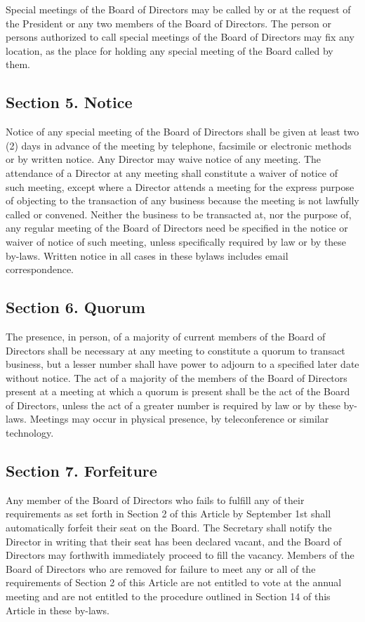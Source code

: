 \documentclass[a4paper]{article}
\begin{document}
Special meetings of the Board of Directors may be called by or at the request of the President or any two members of the Board of Directors.  The person or persons authorized to call special meetings of the Board of Directors may fix any location, as the place for holding any special meeting of the Board called by them.

\subsection*{Section 5. Notice}

Notice of any special meeting of the Board of Directors shall be given at least two (2) days in advance of the meeting by telephone, facsimile or electronic methods or by written notice.  Any Director may waive notice of any meeting.  The attendance of a Director at any meeting shall constitute a waiver of notice of such meeting, except where a Director attends a meeting for the express purpose of objecting to the transaction of any business because the meeting is not lawfully called or convened.  Neither the business to be transacted at, nor the purpose of, any regular meeting of the Board of Directors need be specified in the notice or waiver of notice of such meeting, unless specifically required by law or by these by-laws.
Written notice in all cases in these bylaws includes email correspondence.

\subsection*{Section 6. Quorum}

The presence, in person, of a majority of current members of the Board of Directors shall be necessary at any meeting to constitute a quorum to transact business, but a lesser number shall have power to adjourn to a specified later date without notice.  The act of a majority of the members of the Board of Directors present at a meeting at which a quorum is present shall be the act of the Board of Directors, unless the act of a greater number is required by law or by these by-laws.
Meetings may occur in physical presence, by teleconference or similar technology.

\subsection*{Section 7. Forfeiture}

Any member of the Board of Directors who fails to fulfill any of their requirements as set forth in Section 2 of this Article by September 1st shall automatically forfeit their seat on the Board.  The Secretary shall notify the Director in writing that their seat has been declared vacant, and the Board of Directors may forthwith immediately proceed to fill the vacancy.  Members of the Board of Directors who are removed for failure to meet any or all of the requirements of Section 2 of this Article are not entitled to vote at the annual meeting and are not entitled to the procedure outlined in Section 14 of this Article in these by-laws.
\end{document}
